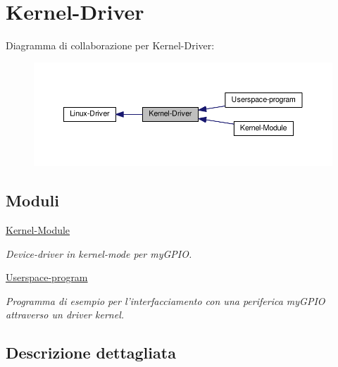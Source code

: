 \hypertarget{group___kernel-_driver}{\section{Kernel-\/\+Driver}
\label{group___kernel-_driver}
}
Diagramma di collaborazione per Kernel-\/\+Driver\+:\nopagebreak
\begin{figure}[H]
\begin{center}
\leavevmode
\includegraphics[width=350pt]{group___kernel-_driver}
\end{center}
\end{figure}
\subsection*{Moduli}
\begin{DoxyCompactItemize}
\item 
\hyperlink{group___kernel-_module}{Kernel-\/\+Module}
\begin{DoxyCompactList}\small\item\em Device-\/driver in kernel-\/mode per my\+G\+P\+I\+O. \end{DoxyCompactList}\item 
\hyperlink{group___userspace-program}{Userspace-\/program}
\begin{DoxyCompactList}\small\item\em Programma di esempio per l'interfacciamento con una periferica my\+G\+P\+I\+O attraverso un driver kernel. \end{DoxyCompactList}\end{DoxyCompactItemize}


\subsection{Descrizione dettagliata}

